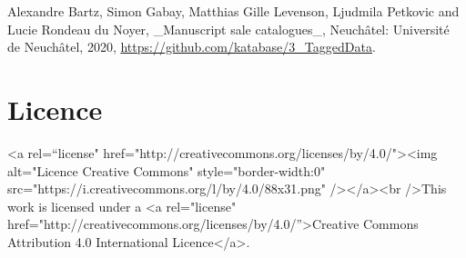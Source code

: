 Alexandre Bartz, Simon Gabay, Matthias Gille Levenson, Ljudmila Petkovic and Lucie Rondeau du Noyer, \_Manuscript sale catalogues\_, Neuchâtel: Université de Neuchâtel, 2020, \href{https://github.com/katabase/3\_TaggedData}{https://github.com/katabase/3\_TaggedData}.
\section*{Licence}

<a rel=\enquote{license" href="http://creativecommons.org/licenses/by/4.0/"\textgreater{}<img alt="Licence Creative Commons" style="border-width:0" src="https://i.creativecommons.org/l/by/4.0/88x31.png" /\textgreater{}</a\textgreater{}<br /\textgreater{}This work is licensed under a <a rel="license" href="http://creativecommons.org/licenses/by/4.0/}\textgreater{}Creative Commons Attribution 4.0 International Licence</a\textgreater{}.